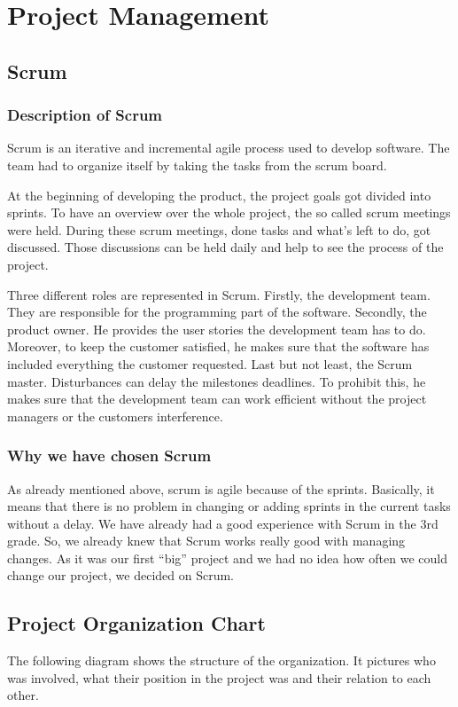 \chapter{Project Management}
\section{Scrum}
\subsection{Description of Scrum}
Scrum is an iterative and incremental agile process used to develop software. The team had to organize itself by taking the tasks from the scrum board.

At the beginning of developing the product, the project goals got divided into sprints. To have an overview over the whole project, the so called scrum meetings were held. During these scrum meetings, done tasks and what's left to do, got discussed. Those discussions can be held daily and help to see the process of the project.

Three different roles are represented in Scrum. Firstly, the development team. They are responsible for the programming part of the software. Secondly, the product owner. He provides the user stories the development  team has to do. Moreover, to keep the customer satisfied, he makes sure that the software has included everything the customer requested. Last but not least, the Scrum master. Disturbances can delay the milestones deadlines. To prohibit this, he makes sure that the development team can work efficient without the project managers or the customers interference.

\subsection{Why we have chosen Scrum}
As already mentioned above, scrum is agile because of the sprints. Basically, it means that there is no problem in changing or adding sprints in the current tasks without a delay. We have already had a good experience with Scrum in the 3rd grade. So, we already knew that Scrum works really good with managing changes. As it was our first “big” project and we had no idea how often we could change our project, we decided on Scrum.
\newpage
\section{Project Organization Chart}
The following diagram shows the structure of the organization. It pictures who was involved, what their position in the project was and their relation to each other. 

